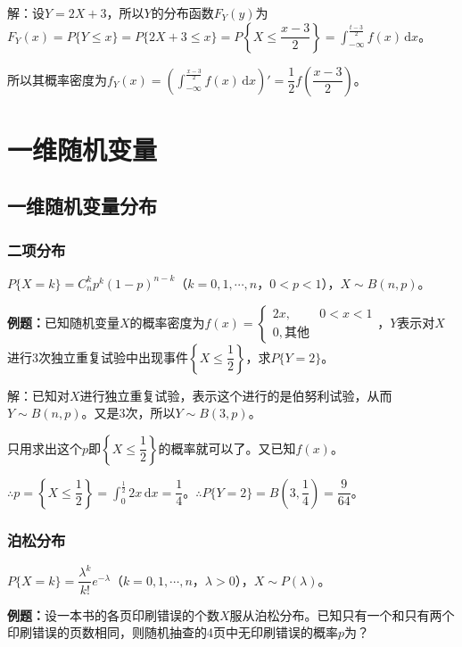 \documentclass[UTF8, 12pt]{ctexart}
\begin{document}
解：设$Y=2X+3$，所以$Y$的分布函数$F_Y(y)$为$F_Y(x)=P\{Y\leqslant x\}=P\{2X+3\leqslant x\}=P\left\{X\leqslant\dfrac{x-3}{2}\right\}=\int_{-\infty}^{\frac{t-3}{2}}f(x)\,\textrm{d}x$。

所以其概率密度为$f_Y(x)=(\int_{-\infty}^{\frac{x-3}{2}}f(x)\,\textrm{d}x)'=\dfrac{1}{2}f\left(\dfrac{x-3}{2}\right)$。

\section{一维随机变量}

\subsection{一维随机变量分布}

\subsubsection{二项分布}

$P\{X=k\}=C_n^kp^k(1-p)^{n-k}$（$k=0,1,\cdots,n$，$0<p<1$），$X\sim B(n,p)$。

\textbf{例题：}已知随机变量$X$的概率密度为$f(x)=\left\{\begin{array}{ll}
    2x, & 0<x<1 \\
    0, \text{其他}
\end{array}\right.$，$Y$表示对$X$进行3次独立重复试验中出现事件$\left\{X\leqslant\dfrac{1}{2}\right\}$，求$P\{Y=2\}$。\medskip

解：已知对$X$进行独立重复试验，表示这个进行的是伯努利试验，从而$Y\sim B(n,p)$。又是3次，所以$Y\sim B(3,p)$。

只用求出这个$p$即$\left\{X\leqslant\dfrac{1}{2}\right\}$的概率就可以了。又已知$f(x)$。

$\therefore p=\left\{X\leqslant\dfrac{1}{2}\right\}=\int_0^\frac{1}{2}2x\,\textrm{d}x=\dfrac{1}{4}$。$\therefore P\{Y=2\}=B\left(3,\dfrac{1}{4}\right)=\dfrac{9}{64}$。

\subsubsection{泊松分布}

$P\{X=k\}=\dfrac{\lambda^k}{k!}e^{-\lambda}$（$k=0,1,\cdots,n$，$\lambda>0$），$X\sim P(\lambda)$。

\textbf{例题：}设一本书的各页印刷错误的个数$X$服从泊松分布。已知只有一个和只有两个印刷错误的页数相同，则随机抽查的4页中无印刷错误的概率$p$为？
\end{document}
